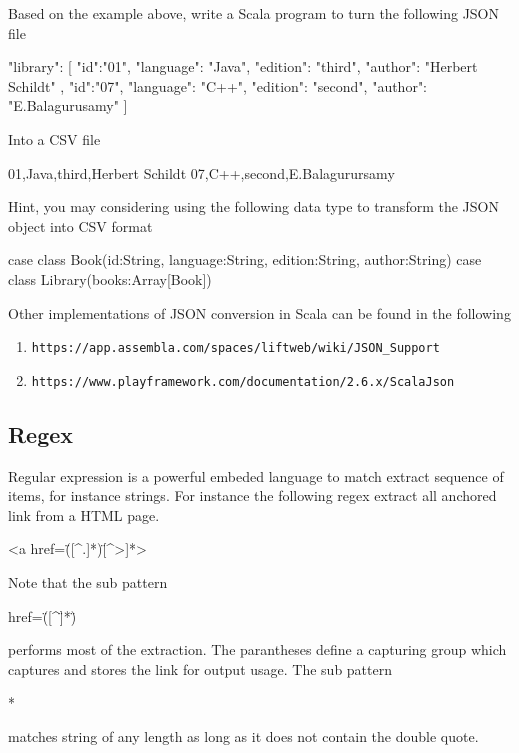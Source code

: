 \documentclass[10pt]{article}
\begin{document}
Based on the example above, write a Scala program to turn the
  following JSON file
  \begin{code}
{
   "library": [	
      {
         "id":"01",
         "language": "Java",
         "edition": "third",
         "author": "Herbert Schildt"
      },	
      {
         "id":"07",
         "language": "C++",
         "edition": "second",
         "author": "E.Balagurusamy"
      }
   ]
}
  \end{code}
  Into a CSV file
  \begin{code}
    01,Java,third,Herbert Schildt
    07,C++,second,E.Balagurursamy
  \end{code}  

%
Hint, you may considering using the following data type to transform
the JSON object into CSV format
\begin{code}
    case class Book(id:String, language:String, edition:String, author:String)
    case class Library(books:Array[Book])
  \end{code}


Other implementations of JSON conversion in Scala can be found in the
following 
\begin{enumerate}
\item
\begin{verbatim}
https://app.assembla.com/spaces/liftweb/wiki/JSON_Support
\end{verbatim}
\item
\begin{verbatim}
https://www.playframework.com/documentation/2.6.x/ScalaJson
\end{verbatim}
\end{enumerate}


\subsection{Regex}

Regular expression is a powerful embeded language to match extract
sequence of items, for instance strings. For instance the following
regex extract all anchored link from a HTML page.
\begin{code}
<a href=\"([^.]*)\"[^>]*>
\end{code}
Note that the sub pattern
\begin{code}
  href=\"([^\"]*)\"
\end{code}
performs most of the extraction. The parantheses define a capturing group which captures and stores the
link for output usage. The sub pattern
\begin{code}
 [\^"]*
\end{code}
matches string of any length as
long as it does not contain the double quote.
\end{document}
